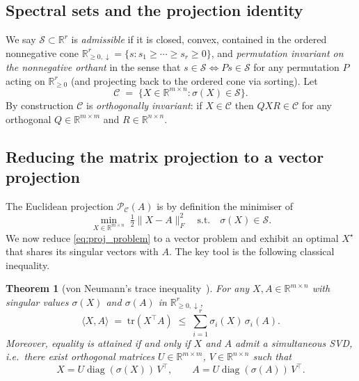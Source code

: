 \documentclass[10pt,a4paper]{amsart}
\newtheorem{theorem}{Theorem}
\DeclareMathOperator{\diag}{diag}
\newcommand{\R}{\mathbb{R}}
\newcommand{\sgm}{\sigma}
\newcommand{\proj}{\mathcal{P}}
\newcommand{\spec}{\mathcal{S}}
\newcommand{\Cset}{\mathcal{C}}
\begin{document}
\subsection{Spectral sets and the projection identity}
We say $\spec \subset \R^r$ is \emph{admissible} if it is closed, convex,
contained in the ordered nonnegative cone
$\R^r_{\ge 0,\downarrow} = \{s : s_1 \ge \cdots \ge s_r \ge 0\}$,
and \emph{permutation invariant on the nonnegative orthant} in the sense
that $s \in \spec \iff Ps \in \spec$ for any permutation $P$ acting on
$\R^r_{\ge 0}$ (and projecting back to the ordered cone via sorting).
Let
\begin{equation}\label{eq:Cset}
\Cset \;=\; \{ X \in \R^{m\times n} : \sgm(X) \in \spec \}.
\end{equation}
By construction $\Cset$ is \emph{orthogonally invariant}: if $X \in
\Cset$ then $QXR \in \Cset$ for any orthogonal $Q \in \R^{m\times m}$
and $R \in \R^{n\times n}$.

\subsection{Reducing the matrix projection to a vector projection}
\label{sec:proof}
The Euclidean projection $\proj_\Cset(A)$ is by definition the
minimiser of
\begin{equation}\label{eq:proj_problem}
\min_{X \in \R^{m\times n}} \; \tfrac{1}{2}\|X - A\|_F^2
\quad \text{s.t.}\quad \sgm(X) \in \spec.
\end{equation}
We now reduce \eqref{eq:proj_problem} to a vector problem and exhibit
an optimal $X^\star$ that shares its singular vectors with $A$. The
key tool is the following classical inequality.

\begin{theorem}[von Neumann's trace inequality~\cite{vonNeumann1937}]
\label{thm:vN}
For any $X, A \in \R^{m\times n}$ with singular values
$\sgm(X)$ and $\sgm(A)$ in $\R^r_{\ge 0,\downarrow}$,
\begin{equation}\label{eq:vN}
\langle X, A\rangle \;=\; \mathrm{tr}(X^\top A)
\;\le\; \sum_{i=1}^{r} \sgm_i(X)\,\sgm_i(A).
\end{equation}
Moreover, equality is attained if and only if $X$ and $A$ admit a
\emph{simultaneous SVD}, i.e.\ there exist orthogonal matrices
$U \in \R^{m\times m}$, $V \in \R^{n\times n}$ such that
\begin{equation}\label{eq:sameUV}
X = U \diag(\sgm(X))\,V^\top, \qquad
A = U \diag(\sgm(A))\,V^\top.
\end{equation}
\end{theorem}
\end{document}
